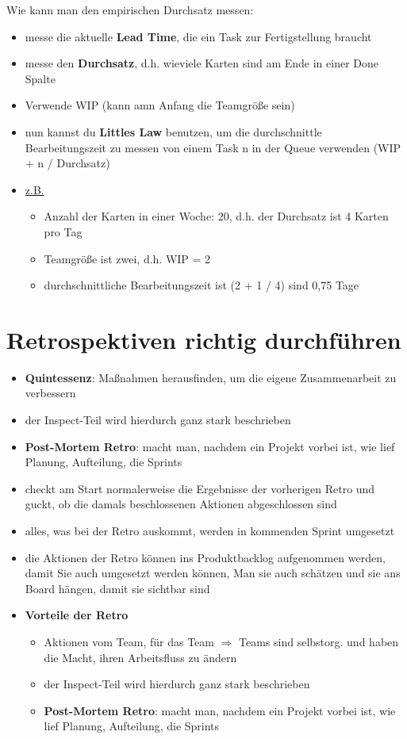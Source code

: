 Wie kann man den empirischen Durchsatz messen:

\begin{itemize}
  \item messe die aktuelle \textbf{Lead Time}, die ein Task zur Fertigstellung braucht
  \item messe den \textbf{Durchsatz}, d.h. wieviele Karten sind am Ende in einer Done Spalte
  \item Verwende WIP (kann amn Anfang die Teamgröße sein)
  \item nun kannst du \textbf{Littles Law} benutzen, um die durchschnittle Bearbeitungszeit zu
    messen von einem Task n in der Queue verwenden (WIP + n / Durchsatz)
  \item \uline{z.B.}
    \begin{itemize}
      \item Anzahl der Karten in einer Woche: 20, d.h. der Durchsatz ist 4 Karten pro Tag
      \item Teamgröße ist zwei, d.h. WIP = 2
      \item durchschnittliche Bearbeitungszeit ist (2 + 1 / 4) sind 0,75 Tage
    \end{itemize}
\end{itemize}
\pagebreak


\section{Retrospektiven richtig durchführen}
\begin{itemize}
  \item \textbf{Quintessenz}: Maßnahmen herausfinden, um die eigene Zusammenarbeit zu verbessern
  \item der Inspect-Teil wird hierdurch ganz stark beschrieben
  \item \textbf{Post-Mortem Retro}: macht man, nachdem ein Projekt vorbei ist, wie lief
    Planung, Aufteilung, die Sprints
  \item checkt am Start normalerweise die Ergebnisse der vorherigen Retro und guckt, ob die damals beschlossenen Aktionen abgeschlossen sind
  \item alles, was bei der Retro auskommt, werden in kommenden Sprint umgesetzt
  \item die Aktionen der Retro können ins Produktbacklog aufgenommen werden, damit Sie auch
    umgesetzt werden können, Man sie auch schätzen und sie ans Board hängen, damit sie sichtbar sind
  \item \textbf{Vorteile der Retro}
    \begin{itemize}
      \item Aktionen vom Team, für das Team $\Rightarrow$  Teams sind selbstorg. und haben die
        Macht, ihren Arbeitsfluss zu ändern
      \item der Inspect-Teil wird hierdurch ganz stark beschrieben
      \item \textbf{Post-Mortem Retro}: macht man, nachdem ein Projekt vorbei ist, wie
        lief Planung, Aufteilung, die Sprints
    \end{itemize}
\end{itemize}


